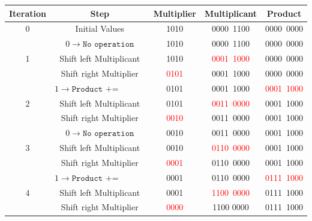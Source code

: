 \documentclass[12pt]{article}
\begin{document}
\begin{table}[h!]
    \centering
    \begin{tabular}{|c|c|c|c|c|}
    \hline
    \textbf{Iteration} & \textbf{Step} & \textbf{Multiplier} & \textbf{Multiplicant} & \textbf{Product}  \\
    \hline
    0 & Initial Values                 & 1010                & 0000\ 1100            & 0000\ 0000        \\
    \hline
    \multirow{3}{*}{1} 
     & $0\rightarrow\texttt{No operation}$ & 1010            & 0000\ 1100            & 0000\ 0000        \\
    \cline{2-5}
     & Shift left Multiplicant         & 1010                & \textcolor{red}{0001\ 1000} & 0000\ 0000  \\
    \cline{2-5}
     & Shift right Multiplier          & \textcolor{red}{0101} & 0001\ 1000          & 0000\ 0000        \\
    \hline
    \multirow{3}{*}{2}
     & $1\rightarrow\texttt{Product += Multiplicant}$ & 0101 & 0001\ 1000            & \textcolor{red}{0001\ 1000} \\
    \cline{2-5}
     & Shift left Multiplicant         & 0101                & \textcolor{red}{0011\ 0000} & 0001\ 1000  \\
    \cline{2-5}
     & Shift right Multiplier          & \textcolor{red}{0010} & 0011\ 0000          & 0001\ 1000        \\
    \hline
    \multirow{3}{*}{3}
     & $0\rightarrow\texttt{No operation}$ & 0010            & 0011\ 0000            & 0001\ 1000        \\
    \cline{2-5}
     & Shift left Multiplicant         & 0010                & \textcolor{red}{0110\ 0000} & 0001\ 1000  \\
    \cline{2-5}
     & Shift right Multiplier          & \textcolor{red}{0001} & 0110\ 0000          & 0001\ 1000        \\
    \hline
    \multirow{3}{*}{4}
     & $1\rightarrow\texttt{Product += Multiplicant}$ & 0001 & 0110\ 0000            & \textcolor{red}{0111\ 1000} \\
    \cline{2-5}
     & Shift left Multiplicant         & 0001                & \textcolor{red}{1100\ 0000} & 0111\ 1000  \\
    \cline{2-5}
     & Shift right Multiplier          & \textcolor{red}{0000} & 1100 0000           & 0111\ 1000        \\
    \hline
    \end{tabular}
\end{table}
\end{document}
